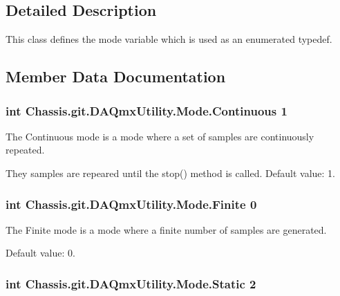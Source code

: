 \subsection{Detailed Description}
This class defines the mode variable which is used as an enumerated typedef. 



\subsection{Member Data Documentation}
\hypertarget{class_chassis_8git_1_1_d_a_qmx_utility_1_1_mode_afe15b7dc045cfbb757f22256762f40cd}{
\subsubsection[{Continuous}]{\setlength{\rightskip}{0pt plus 5cm}int Chassis.\-git.\-D\-A\-Qmx\-Utility.\-Mode.\-Continuous 1\hspace{0.3cm}{\ttfamily [static]}}}\label{class_chassis_8git_1_1_d_a_qmx_utility_1_1_mode_afe15b7dc045cfbb757f22256762f40cd}


The Continuous mode is a mode where a set of samples are continuously repeated. 

They samples are repeared until the stop() method is called. Default value\-: 1. \hypertarget{class_chassis_8git_1_1_d_a_qmx_utility_1_1_mode_a5f80bc9368631cb74ab852b829668b20}{
\subsubsection[{Finite}]{\setlength{\rightskip}{0pt plus 5cm}int Chassis.\-git.\-D\-A\-Qmx\-Utility.\-Mode.\-Finite 0\hspace{0.3cm}{\ttfamily [static]}}}\label{class_chassis_8git_1_1_d_a_qmx_utility_1_1_mode_a5f80bc9368631cb74ab852b829668b20}


The Finite mode is a mode where a finite number of samples are generated. 

Default value\-: 0. \hypertarget{class_chassis_8git_1_1_d_a_qmx_utility_1_1_mode_a756d944f9ac18e990a1d090873c23da7}{
\subsubsection[{Static}]{\setlength{\rightskip}{0pt plus 5cm}int Chassis.\-git.\-D\-A\-Qmx\-Utility.\-Mode.\-Static 2\hspace{0.3cm}{\ttfamily [static]}}}\label{class_chassis_8git_1_1_d_a_qmx_utility_1_1_mode_a756d944f9ac18e990a1d090873c23da7}


